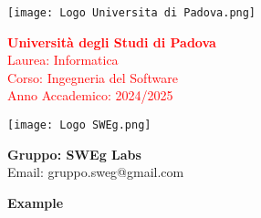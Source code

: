 \begin{minipage}{0.4\textwidth}
    \texttt{[image: Logo Universita di Padova.png]}
\end{minipage}
\begin{minipage}{0.55\textwidth}
    \textcolor{red}{\textbf{Università degli Studi di Padova}} \\
    \textcolor{red}{Laurea: Informatica} \\
    \textcolor{red}{Corso: Ingegneria del Software} \\
    \textcolor{red}{Anno Accademico: 2024/2025}
\end{minipage}

\begin{minipage}{0.4\textwidth}
    \texttt{[image: Logo SWEg.png]}
\end{minipage}
\begin{minipage}{0.55\textwidth}
    \textbf{Gruppo: SWEg Labs} \\
    Email: \textsf{gruppo.sweg@gmail.com}
\end{minipage}

\vspace{2cm}

{
\centering
\Huge\bfseries Example\par
}

\vspace{2cm}